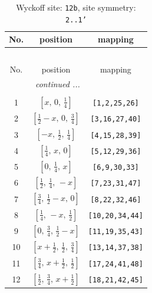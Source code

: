 \documentclass[fleqn,8pt]{jsarticle}
\begin{document}
\begin{longtable}{ccc}
\caption{Wyckoff site: {\tt 12b}, site symmetry: {\tt 2..1'}}
 \\
 \hline \hline
No. & position & mapping \\ \hline \endfirsthead

\multicolumn{2}{l}{\tablename\ \thetable{}} \\
 \hline \hline
No. & position & mapping \\ \hline \endhead

 \hline \hline
\multicolumn{2}{r}{\footnotesize\it continued ...} \\ \endfoot

 \hline \hline
\multicolumn{2}{r}{} \\ \endlastfoot

1 & $\left[ x,\, 0,\, \frac{1}{4} \right]$ & {\tt [1,2,25,26]} \\ \hline
2 & $\left[ \frac{1}{2} - x,\, 0,\, \frac{3}{4} \right]$ & {\tt [3,16,27,40]} \\ \hline
3 & $\left[ - x,\, \frac{1}{2},\, \frac{1}{4} \right]$ & {\tt [4,15,28,39]} \\ \hline
4 & $\left[ \frac{1}{4},\, x,\, 0 \right]$ & {\tt [5,12,29,36]} \\ \hline
5 & $\left[ 0,\, \frac{1}{4},\, x \right]$ & {\tt [6,9,30,33]} \\ \hline
6 & $\left[ \frac{1}{2},\, \frac{1}{4},\, - x \right]$ & {\tt [7,23,31,47]} \\ \hline
7 & $\left[ \frac{3}{4},\, \frac{1}{2} - x,\, 0 \right]$ & {\tt [8,22,32,46]} \\ \hline
8 & $\left[ \frac{1}{4},\, - x,\, \frac{1}{2} \right]$ & {\tt [10,20,34,44]} \\ \hline
9 & $\left[ 0,\, \frac{3}{4},\, \frac{1}{2} - x \right]$ & {\tt [11,19,35,43]} \\ \hline
10 & $\left[ x + \frac{1}{2},\, \frac{1}{2},\, \frac{3}{4} \right]$ & {\tt [13,14,37,38]} \\ \hline
11 & $\left[ \frac{3}{4},\, x + \frac{1}{2},\, \frac{1}{2} \right]$ & {\tt [17,24,41,48]} \\ \hline
12 & $\left[ \frac{1}{2},\, \frac{3}{4},\, x + \frac{1}{2} \right]$ & {\tt [18,21,42,45]} \\
\end{longtable}
\renewcommand{\arraystretch}{1.2}
\end{document}
